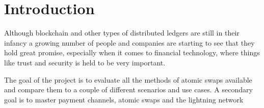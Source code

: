 
\chapter{Introduction}
Although blockchain and other types of distributed ledgers are still in their
infancy a growing number of people and companies are starting to see that they
hold great promise, especially when it comes to financial technology, where
things like trust and security is held to be very important.






The goal of the project is to evaluate all the methods of atomic swaps available
and compare them to a couple of different scenarios and use cases. A secondary
goal is to master payment channels, atomic swaps and the lightning network


